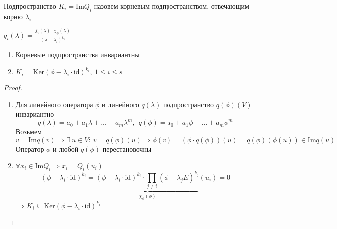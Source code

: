     \begin{definition}
        Подпространство $K_i = \text{Im} Q_i$ назовем корневым подпространством, отвечающим корню $\lambda_i$
    \end{definition}
    $q_i(\lambda) = \frac{f_i(\lambda)\cdot \chi_\phi(\lambda)}{(\lambda-\lambda_i)^{k_i}}$ 
    \begin{subtheorem}\tab
        \begin{enumerate}
            \item Корневые подпространства инвариантны
            \item $K_i = \text{Ker} (\phi - \lambda_i\cdot \text{id})^{k_i}, \ 1\leq i \leq s$ 
        \end{enumerate}
    \end{subtheorem}
    \begin{proof}\tab 
        \begin{enumerate}
            \item Для линейного оператора $\phi$ и линейного $q(\lambda)$ подпространство $q(\phi)(V)$ инвариантно
            $$q(\lambda) = a_0+ a_1 \lambda + ... + a_m \lambda^m, \ \ q(\phi) = a_0+ a_1 \phi + ... + a_m \phi^m$$
            Возьмем $v = \text{Im}q(v) \Longrightarrow \exists \ u \in V: \ v = q(\phi)(u) \Longrightarrow \phi(v) = (\phi \cdot q(\phi))(u) = q(\phi)(\phi(u)) \in \text{Im}q(u)$
            Оператор $\phi$ и любой $q(\phi)$ перестановочны
            \item $\forall x_i \in \text{Im}Q_i \Longrightarrow x_i = Q_i(u_i)$
            $$(\phi-\lambda_i \cdot \text{id})^{k_i} = \underbrace{(\phi-\lambda_i \cdot \text{id})^{k_i} \cdot \prod\limits_{j \neq i}(\phi-\lambda_j E)^{k_j}}_{\chi_\phi(\phi)}(u_i) = 0$$
            $\Longrightarrow K_i \subseteq \text{Ker}(\phi-\lambda_i \cdot \text{id})^{k_i}$     
        \end{enumerate}
    \end{proof} 